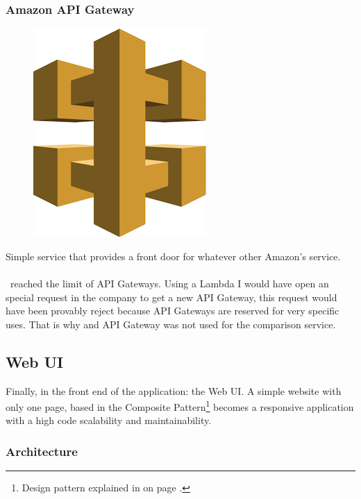 \subsubsection*{Amazon API Gateway}

\begin{figure}[H]
\includegraphics[scale=0.2]{resources/api-logo.png}
\end{figure}

Simple service that provides a front door for whatever other Amazon's service.
\\\\
\company\ reached the limit of API Gateways\cite{api-gateway}. Using a Lambda I would have open an special request in the company to get a new API Gateway, this request would have been provably reject because API Gateways are reserved for very specific uses. That is why  and API Gateway was not used for the comparison service.



\subsection{Web UI} \label{web-ui}

Finally, in the front end of the application: the Web UI. A simple website with only one page, based in the Composite Pattern\footnote{Design pattern explained in  on page \pageref{appendix_b}.} becomes a responsive application with a high code scalability and maintainability.

\subsubsection*{Architecture}

